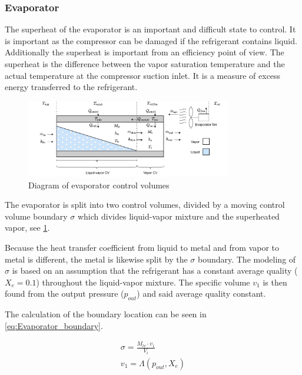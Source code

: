 \subsubsection{Evaporator}
The superheat of the evaporator is an important and difficult state to control. It is important as the compressor can be damaged if the refrigerant contains liquid. Additionally the superheat is important from an efficiency point of view.
The superheat is the difference between the vapor saturation temperature and the actual temperature at the compressor suction inlet. It is a measure of excess energy transferred to the refrigerant.

\clearpage

\begin{figure}[h!]
	\centering
	\includegraphics[width=0.8\textwidth]{Graphics/Evaporator_CV_diagram.pdf}
	\caption{Diagram of evaporator control volumes}
	\label{fig:evap_CV}
\end{figure}

The evaporator is split into two control volumes, divided by a moving control volume boundary $\sigma$ which divides liquid-vapor mixture and the superheated vapor, see \cref{fig:evap_CV}.

Because the heat transfer coefficient from liquid to metal and from vapor to metal is different, the metal is likewise split by the $\sigma$ boundary. The modeling of $\sigma$ is based on an assumption that the refrigerant has a constant average quality ($X_e = 0.1$) throughout the liquid-vapor mixture. The specific volume $v_1$ is then found from the output pressure ($p_{out}$) and said average quality constant.

The calculation of the boundary location can be seen in \cref{eq:Evaporator_boundary}.

\begin{align} \label{eq:Evaporator_boundary}
	\sigma = \frac{M_{lv} \cdot v_1}{V_i} \\
	v_1 = \Lambda(p_{out},X_e)
\end{align}

